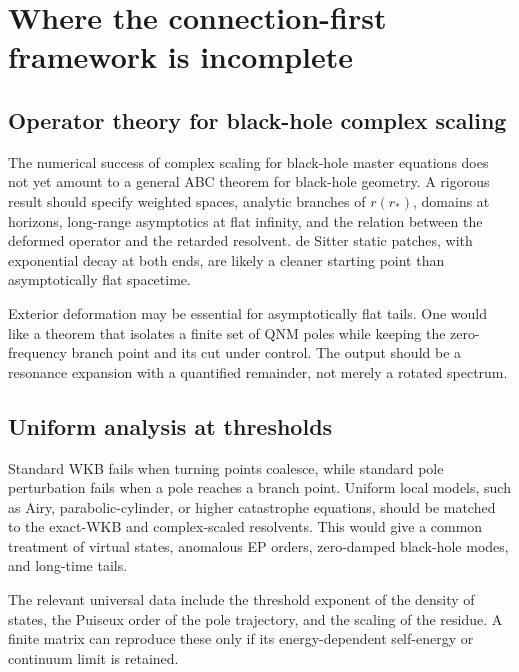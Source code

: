 \section{Where the connection-first framework is incomplete}
\label{sec:open-problems}

\subsection{Operator theory for black-hole complex scaling}
\label{subsec:open-operator-bh}

The numerical success of complex scaling for black-hole master equations does
not yet amount to a general ABC theorem for black-hole geometry.  A rigorous
result should specify weighted spaces, analytic branches of $r(r_*)$, domains
at horizons, long-range asymptotics at flat infinity, and the relation between
the deformed operator and the retarded resolvent.  de Sitter static patches,
with exponential decay at both ends, are likely a cleaner starting point than
asymptotically flat spacetime.

Exterior deformation may be essential for asymptotically flat tails.  One
would like a theorem that isolates a finite set of QNM poles while keeping the
zero-frequency branch point and its cut under control.  The output should be a
resonance expansion with a quantified remainder, not merely a rotated spectrum.

\subsection{Uniform analysis at thresholds}
\label{subsec:open-thresholds}

Standard WKB fails when turning points coalesce, while standard pole
perturbation fails when a pole reaches a branch point.  Uniform local models,
such as Airy, parabolic-cylinder, or higher catastrophe equations, should be
matched to the exact-WKB and complex-scaled resolvents.  This would give a
common treatment of virtual states, anomalous EP orders, zero-damped black-hole
modes, and long-time tails.

The relevant universal data include the threshold exponent of the density of
states, the Puiseux order of the pole trajectory, and the scaling of the
residue.  A finite matrix can reproduce these only if its energy-dependent
self-energy or continuum limit is retained.

